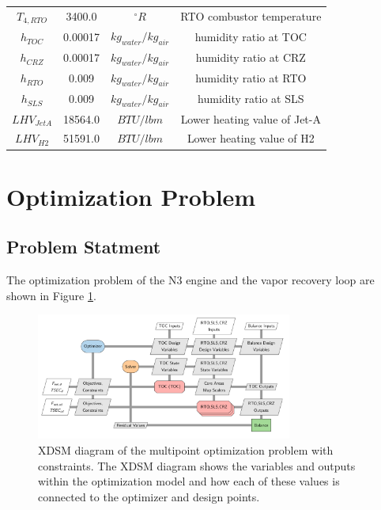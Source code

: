 \documentclass[conf]{new-aiaa}
\begin{document}
\begin{table}[hbt!]
\begin{tabular}{c c c c}
        $T_{4,RTO}$           & 3400.0   & $^{\circ}R$           & RTO combustor temperature                  \\
        $h_{TOC}$             & 0.00017  & $kg_{water}/kg_{air}$ & humidity ratio at TOC \cite{Kalnay1996}    \\
        $h_{CRZ}$             & 0.00017  & $kg_{water}/kg_{air}$ & humidity ratio at CRZ \cite{Kalnay1996}    \\
        $h_{RTO}$             & 0.009    & $kg_{water}/kg_{air}$ & humidity ratio at RTO \cite{Kalnay1996}    \\
        $h_{SLS}$             & 0.009    & $kg_{water}/kg_{air}$ & humidity ratio at SLS \cite{Kalnay1996}    \\
        $LHV_{JetA}$          & 18564.0  & $BTU/lbm$             & Lower heating value of Jet-A               \\
        $LHV_{H2}$            & 51591.0  & $BTU/lbm$             & Lower heating value of H2                  \\
        \hline
    \end{tabular}
    \label{engine_params}
\end{table}

\section{Optimization Problem}
\label{sec:optprob}

\subsection{Problem Statment}
The optimization problem of the N3 engine and the vapor recovery loop are shown in Figure \ref{fig:N3_xdsm_opt}.

\begin{figure}[hbt!]
    \centering
    \includegraphics[width=0.75\textwidth]{N3_xdsm_opt.pdf}
    \caption{
        XDSM diagram of the multipoint optimization problem with constraints.
        The XDSM diagram shows the variables and outputs within the optimization model and how each of these values is connected to the optimizer and design points.}
    \label{fig:N3_xdsm_opt}
\end{figure}
\end{document}
